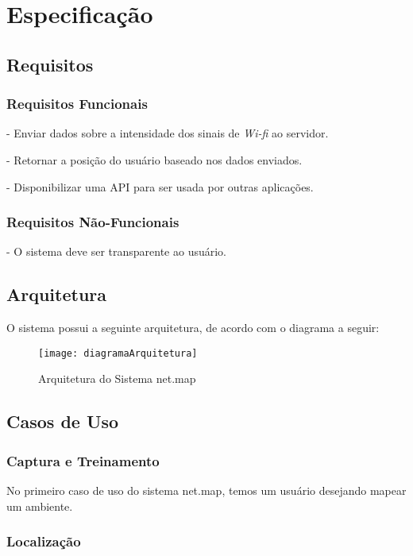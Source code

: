 
\chapter{Especificação}\label{chp:espec}
\section{Requisitos}\label{sec:req}

\subsection{Requisitos Funcionais}
- Enviar dados sobre a intensidade dos sinais de \textit{Wi-fi} ao servidor. \par
- Retornar a posição do usuário baseado nos dados enviados.\par
- Disponibilizar uma API para ser usada por outras aplicações.\par


\subsection{Requisitos Não-Funcionais}

- O sistema deve ser transparente ao usuário.\par


\section{Arquitetura}


O sistema possui a seguinte arquitetura, de acordo com o diagrama a seguir:

\begin{figure}[H]
	\centering
	\caption{Arquitetura do Sistema net.map}
  \texttt{[image: diagramaArquitetura]}
\label{fig:diagramafluxo}

\end{figure}


\section{Casos de Uso}

\subsection{Captura e Treinamento}

No primeiro caso de uso do sistema net.map, temos um usuário desejando mapear um ambiente. 


\subsection{Localização}